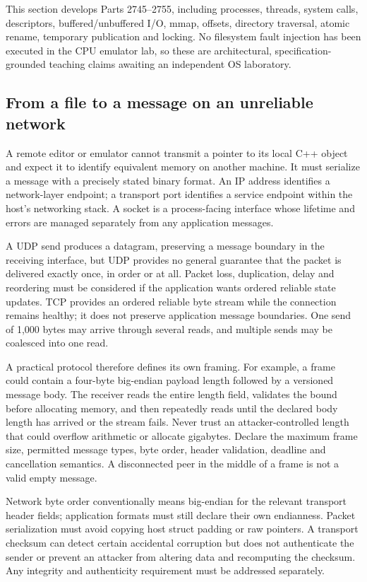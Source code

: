 This section develops Parts 2745--2755, including processes, threads, system calls, descriptors, buffered/unbuffered I/O, mmap, offsets, directory traversal, atomic rename, temporary publication and locking. No filesystem fault injection has been executed in the CPU emulator lab, so these are architectural, specification-grounded teaching claims awaiting an independent OS laboratory.

\subsection{From a file to a message on an unreliable network}\label{from-a-file-to-a-message-on-an-unreliable-network}

A remote editor or emulator cannot transmit a pointer to its local C++ object and expect it to identify equivalent memory on another machine. It must serialize a message with a precisely stated binary format. An IP address identifies a network-layer endpoint; a transport port identifies a service endpoint within the host's networking stack. A socket is a process-facing interface whose lifetime and errors are managed separately from any application messages.

A UDP send produces a datagram, preserving a message boundary in the receiving interface, but UDP provides no general guarantee that the packet is delivered exactly once, in order or at all. Packet loss, duplication, delay and reordering must be considered if the application wants ordered reliable state updates. TCP provides an ordered reliable byte stream while the connection remains healthy; it does not preserve application message boundaries. One send of 1,000 bytes may arrive through several reads, and multiple sends may be coalesced into one read.

A practical protocol therefore defines its own framing. For example, a frame could contain a four-byte big-endian payload length followed by a versioned message body. The receiver reads the entire length field, validates the bound before allocating memory, and then repeatedly reads until the declared body length has arrived or the stream fails. Never trust an attacker-controlled length that could overflow arithmetic or allocate gigabytes. Declare the maximum frame size, permitted message types, byte order, header validation, deadline and cancellation semantics. A disconnected peer in the middle of a frame is not a valid empty message.

Network byte order conventionally means big-endian for the relevant transport header fields; application formats must still declare their own endianness. Packet serialization must avoid copying host struct padding or raw pointers. A transport checksum can detect certain accidental corruption but does not authenticate the sender or prevent an attacker from altering data and recomputing the checksum. Any integrity and authenticity requirement must be addressed separately.

